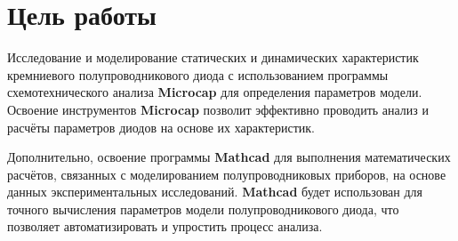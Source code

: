 \section{Цель работы}
Исследование и моделирование статических и динамических характеристик кремниевого полупроводникового диода с использованием программы схемотехнического анализа \textbf{Microcap} для определения параметров модели. Освоение инструментов \textbf{Microcap} позволит эффективно проводить анализ и расчёты параметров диодов на основе их характеристик.

Дополнительно, освоение программы \textbf{Mathcad} для выполнения математических расчётов, связанных с моделированием полупроводниковых приборов, на основе данных экспериментальных исследований. \textbf{Mathcad }будет использован для точного вычисления параметров модели полупроводникового диода, что позволяет автоматизировать и упростить процесс анализа.